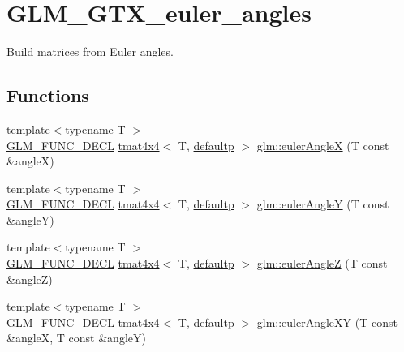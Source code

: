 \hypertarget{group__gtx__euler__angles}{}\section{G\+L\+M\+\_\+\+G\+T\+X\+\_\+euler\+\_\+angles}
\label{group__gtx__euler__angles}


Build matrices from Euler angles.  


\subsection*{Functions}
\begin{DoxyCompactItemize}
\item 
{\footnotesize template$<$typename T $>$ }\\\mbox{\hyperlink{setup_8hpp_ab2d052de21a70539923e9bcbf6e83a51}{G\+L\+M\+\_\+\+F\+U\+N\+C\+\_\+\+D\+E\+CL}} \mbox{\hyperlink{structglm_1_1tmat4x4}{tmat4x4}}$<$ T, \mbox{\hyperlink{namespaceglm_a0f04f086094c747d227af4425893f545a9d21ccd8b5a009ec7eb7677befc3bf51}{defaultp}} $>$ \mbox{\hyperlink{group__gtx__euler__angles_ga82cd3b8a04943f1a0d1a562aff358dc8}{glm\+::euler\+AngleX}} (T const \&angleX)
\item 
{\footnotesize template$<$typename T $>$ }\\\mbox{\hyperlink{setup_8hpp_ab2d052de21a70539923e9bcbf6e83a51}{G\+L\+M\+\_\+\+F\+U\+N\+C\+\_\+\+D\+E\+CL}} \mbox{\hyperlink{structglm_1_1tmat4x4}{tmat4x4}}$<$ T, \mbox{\hyperlink{namespaceglm_a0f04f086094c747d227af4425893f545a9d21ccd8b5a009ec7eb7677befc3bf51}{defaultp}} $>$ \mbox{\hyperlink{group__gtx__euler__angles_gaeb193af1184bdf39c23636d756e1ff33}{glm\+::euler\+AngleY}} (T const \&angleY)
\item 
{\footnotesize template$<$typename T $>$ }\\\mbox{\hyperlink{setup_8hpp_ab2d052de21a70539923e9bcbf6e83a51}{G\+L\+M\+\_\+\+F\+U\+N\+C\+\_\+\+D\+E\+CL}} \mbox{\hyperlink{structglm_1_1tmat4x4}{tmat4x4}}$<$ T, \mbox{\hyperlink{namespaceglm_a0f04f086094c747d227af4425893f545a9d21ccd8b5a009ec7eb7677befc3bf51}{defaultp}} $>$ \mbox{\hyperlink{group__gtx__euler__angles_gab59c4fe7f735568255cc19fddd3ddfcd}{glm\+::euler\+AngleZ}} (T const \&angleZ)
\item 
{\footnotesize template$<$typename T $>$ }\\\mbox{\hyperlink{setup_8hpp_ab2d052de21a70539923e9bcbf6e83a51}{G\+L\+M\+\_\+\+F\+U\+N\+C\+\_\+\+D\+E\+CL}} \mbox{\hyperlink{structglm_1_1tmat4x4}{tmat4x4}}$<$ T, \mbox{\hyperlink{namespaceglm_a0f04f086094c747d227af4425893f545a9d21ccd8b5a009ec7eb7677befc3bf51}{defaultp}} $>$ \mbox{\hyperlink{group__gtx__euler__angles_ga8bf84f92ca976a7f50dbe4b30ceb72dd}{glm\+::euler\+Angle\+XY}} (T const \&angleX, T const \&angleY)

\end{DoxyCompactItemize}

